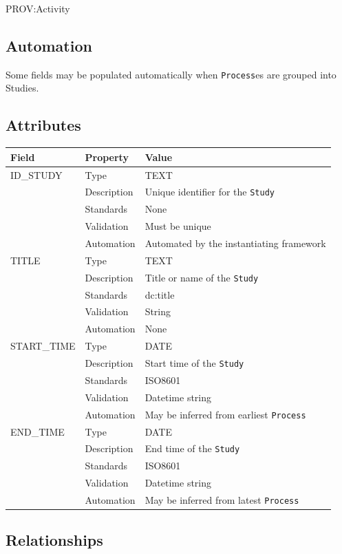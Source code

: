 \documentclass[
]{article}
\newcounter{none}
\begin{document}
PROV:Activity

\subsection{Automation}\label{automation-34}

Some fields may be populated automatically when \texttt{Process}es are
grouped into Studies.

\subsection{Attributes}\label{attributes-29}

{\def\LTcaptype{none} 
\begin{longtable}[]{@{}lll@{}}
\toprule\noalign{}
Field & Property & Value \\
\midrule\noalign{}
\endhead
\bottomrule\noalign{}
\endlastfoot
ID\_STUDY & Type & TEXT \\
& Description & Unique identifier for the \texttt{Study} \\
& Standards & None \\
& Validation & Must be unique \\
& Automation & Automated by the instantiating framework \\
TITLE & Type & TEXT \\
& Description & Title or name of the \texttt{Study} \\
& Standards & dc:title \\
& Validation & String \\
& Automation & None \\
START\_TIME & Type & DATE \\
& Description & Start time of the \texttt{Study} \\
& Standards & ISO8601 \\
& Validation & Datetime string \\
& Automation & May be inferred from earliest \texttt{Process} \\
END\_TIME & Type & DATE \\
& Description & End time of the \texttt{Study} \\
& Standards & ISO8601 \\
& Validation & Datetime string \\
& Automation & May be inferred from latest \texttt{Process} \\
\end{longtable}
}

\subsection{Relationships}\label{relationships-28}
\end{document}
